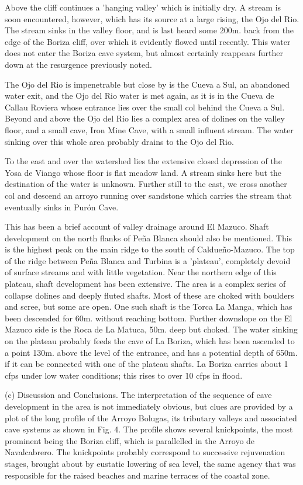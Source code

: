 \documentclass[11pt, a4paper, twoside]{memoir}
\begin{document}
Above the cliff continues a 'hanging valley' which is initially dry. A stream is soon encountered, however, which has its source at a large rising, the Ojo del Rio. The stream sinks in the valley floor, and is last heard some 200m. back from the edge of the Boriza cliff, over which it evidently flowed until recently. This water does not enter the Boriza cave system, but almost certainly reappears further down at the resurgence previously noted.

The Ojo del Rio is impenetrable but close by is the Cueva a Sul, an abandoned water exit, and the Ojo del Rio water is met again, as it is in the Cueva de Callau Roviera whose entrance lies over the small col behind the Cueva a Sul. Beyond and above the Ojo del Rio lies a complex area of dolines on the valley floor, and a small cave, Iron Mine Cave, with a small influent stream. The water sinking over this whole area probably drains to the Ojo del Rio.

To the east and over the watershed lies the extensive closed depression of the Yosa de Viango whose floor is flat meadow land. A stream sinks here but the destination of the water is unknown. Further still to the east, we cross another col and descend an arroyo running over sandstone which carries the stream that eventually sinks in Purón Cave.

This has been a brief account of valley drainage around El Mazuco. Shaft development on the north flanks of Peña Blanca should also be mentioned. This is the highest peak on the main ridge to the south of Caldueño-Mazuco. The top of the ridge between Peña Blanca and Turbina is a 'plateau', completely devoid of surface streams and with little vegetation. Near the northern edge of this plateau, shaft development has been extensive. The area is a complex series of collapse dolines and deeply fluted shafts. Most of these are choked with boulders and scree, but some are open. One such shaft is the Torca La Manga, which has been descended for 60m. without reaching bottom. Further downslope on the El Mazuco side is the Roca de La Matuca, 50m. deep but choked. The water sinking on the plateau probably feeds the cave of La Boriza, which has been ascended to a point 130m. above the level of the entrance, and has a potential depth of 650m. if it can be connected with one of the plateau shafts. La Boriza carries about 1 cfps under low water conditions; this rises to over 10 cfps in flood.

(c) Discussion and Conclusions. The interpretation of the sequence of cave development in the area is not immediately obvious, but clues are provided by a plot of the long profile of the Arroyo Bolugas, its tributary valleys and associated cave systems as shown in Fig. 4. The profile shows several knickpoints, the most prominent being the Boriza cliff, which is parallelled in the Arroyo de Navalcabrero. The knickpoints probably correspond to successive rejuvenation stages, brought about by eustatic lowering of sea level, the same agency that was responsible for the raised beaches and marine terraces of the coastal zone.
\end{document}
